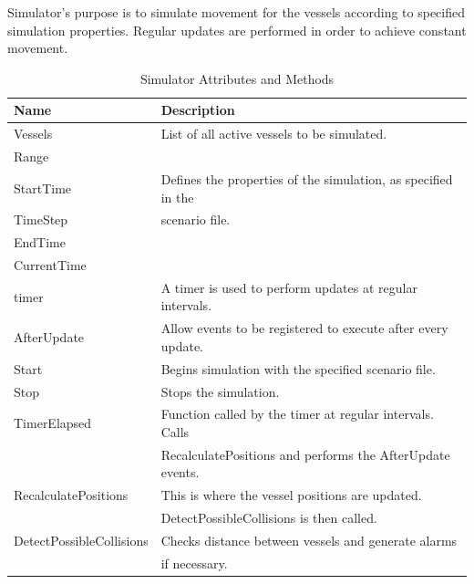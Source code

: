 \documentclass[12pt]{article}
\begin{document}
\vspace*{0.2in}
\vspace*{0.15in}
Simulator’s purpose is to simulate movement for the vessels according to specified simulation properties. Regular updates are performed in order to achieve constant movement.
\clearpage
\begin{table}[ht]
\centering
   \begin{tabular}{|l|l|}
        \hline
        {\large Name} & {\large Description} \\
        \hline\hline
        Vessels & List of all active vessels to be simulated.\\
        \hline
        Range &  \\
        StartTime & Defines the properties of the simulation, as specified in the\\
        TimeStep & scenario file.\\
        EndTime & \\
        CurrentTime & \\
        \hline
        timer & A timer is used to perform updates at regular intervals. \\
        \hline
        AfterUpdate & Allow events to be registered to execute after every update.\\
        \hline
        Start & Begins simulation with the specified scenario file.\\
        \hline
        Stop & Stops the simulation.\\
        \hline
        TimerElapsed & Function called by the timer at regular intervals. Calls\\
         & RecalculatePositions and performs the AfterUpdate events.\\
        \hline
        RecalculatePositions & This is where the vessel positions are updated.\\
                             & DetectPossibleCollisions is then called. \\
        \hline
        DetectPossibleCollisions & Checks distance between vessels and generate alarms\\
                                 & if necessary.\\
        \hline
    \end{tabular}
\caption{Simulator Attributes and Methods}
\end{table}
\end{document}
